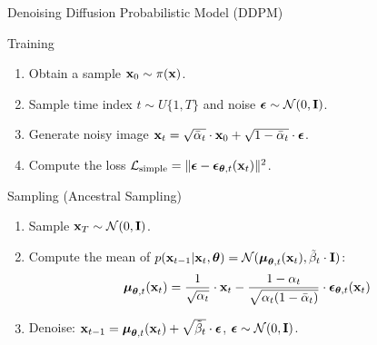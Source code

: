 \documentclass{beamer}
\begin{document}
\begin{frame}{Denoising Diffusion Probabilistic Model (DDPM)}
    \begin{block}{Training}
        \begin{enumerate}
            \item Obtain a sample $\mathbf{x}_0 \sim \pi(\mathbf{x})$.
            \item Sample time index $t \sim U\{1, T\}$ and noise $\boldsymbol{\epsilon} \sim \mathcal{N}(0, \mathbf{I})$.
            \item Generate noisy image $\mathbf{x}_t = \sqrt{\bar{\alpha}_t} \cdot \mathbf{x}_0 + \sqrt{1 - \bar{\alpha}_t} \cdot \boldsymbol{\epsilon}$.
            \item Compute the loss $ \mathcal{L}_{\text{simple}} = \| \boldsymbol{\epsilon} - \boldsymbol{\epsilon}_{\boldsymbol{\theta}, t}(\mathbf{x}_t) \|^2 $.
        \end{enumerate}
    \end{block}
    \eqpause
    \begin{block}{Sampling (Ancestral Sampling)}
        \begin{enumerate}
            \item Sample $\mathbf{x}_T \sim \mathcal{N}(0, \mathbf{I})$.
            \item Compute the mean of $p(\mathbf{x}_{t-1} | \mathbf{x}_t, \boldsymbol{\theta}) = \mathcal{N}(\boldsymbol{\mu}_{\boldsymbol{\theta}, t}(\mathbf{x}_t), \tilde{\beta}_t \cdot \mathbf{I})$:
            \[
                \boldsymbol{\mu}_{\boldsymbol{\theta}, t}(\mathbf{x}_t) = \frac{1}{\sqrt{\alpha_t}} \cdot \mathbf{x}_t - \frac{1 - \alpha_t}{\sqrt{\alpha_t (1 - \bar{\alpha}_t)}} \cdot \boldsymbol{\epsilon}_{\boldsymbol{\theta}, t}(\mathbf{x}_t)
            \]
            \vspace{-0.3cm}
            \item Denoise: $\mathbf{x}_{t - 1} = \boldsymbol{\mu}_{\boldsymbol{\theta}, t}(\mathbf{x}_t) +  \sqrt{\tilde{\beta}_t} \cdot \boldsymbol{\epsilon}$, $\boldsymbol{\epsilon} \sim \mathcal{N}(0, \mathbf{I})$.
        \end{enumerate}
    \end{block}
\end{frame}
\end{document}
